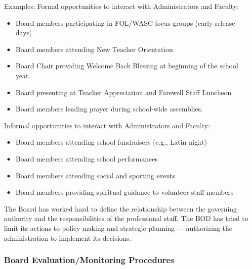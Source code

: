\begin{findings}
Examples:
Formal opportunities to interact with Administrators and Faculty:
\begin{itemize}
\item Board members participating in FOL/WASC focus groups (early release days)
\item Board members attending New Teacher Orientation
\item Board Chair providing Welcome Back Blessing at beginning of the school year. 
\item Board presenting at Teacher Appreciation and Farewell Staff Luncheon 
\item Board members leading prayer during school-wide assemblies.
\end{itemize}

Informal opportunities to interact with Administrators and Faculty: 
\begin{itemize}
\item Board members attending school fundraisers (e.g., Latin night)
\item Board members attending school performances
\item Board members attending social and sporting events
\item Board members providing spiritual guidance to volunteer staff members
\end{itemize}


The Board has worked hard to define the relationship between the governing authority and the responsibilities of the professional staff. The BOD has tried to limit its actions to policy making and strategic planning — authorizing the administration to implement its decisions.
\end{findings}

\subsubsection{Board Evaluation/Monitoring Procedures}



